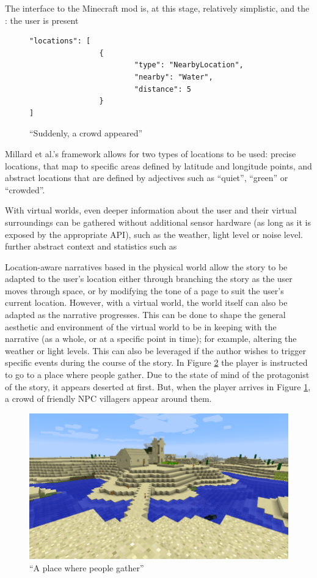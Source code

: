 \documentclass{acm}
\begin{document}
The interface to the Minecraft mod is, at this stage, relatively simplistic, and the : the user is present

\begin{figure}
\centering
\begin{verbatim}
"locations": [
             	{
                		"type": "NearbyLocation",
                        "nearby": "Water",
                        "distance": 5
                }
]
\end{verbatim}

\caption{``Suddenly, a crowd appeared''}
\label{figure:villagers}
\end{figure}


Millard et al.'s framework allows for two types of locations to be used: precise locations, that map to specific areas defined by latitude and longitude points, and abstract locations that are defined by adjectives such as ``quiet'', ``green'' or ``crowded''.

With virtual worlds, even deeper information about the user and their virtual surroundings can be gathered without additional sensor hardware (as long as it is exposed by the appropriate API), such as the weather, light level or noise level.
further abstract context and statistics such as


Location-aware narratives based in the physical world allow the story to be adapted to the user's location either through branching the story as the user moves through space, or by modifying the tone of a page to suit the user's current location. However, with a virtual world, the world itself can also be adapted as the narrative progresses. This can be done to shape the general aesthetic and environment of the virtual world to be in keeping with the narrative (as a whole, or at a specific point in time); for example, altering the weather or light levels.  This can also be leveraged if the author wishes to trigger specific events during the course of the story. In Figure \ref{figure:gather} the player is instructed to go to a place where people gather. Due to the state of mind of the protagonist of the story, it appears deserted at first. But, when the player arrives in Figure \ref{figure:villagers}, a crowd of friendly NPC villagers appear around them.

\begin{figure}
\centering
\includegraphics[scale=.24]{./figures/place.png}
\caption{``A place where people gather''}
\label{figure:gather}
\end{figure}
\end{document}
